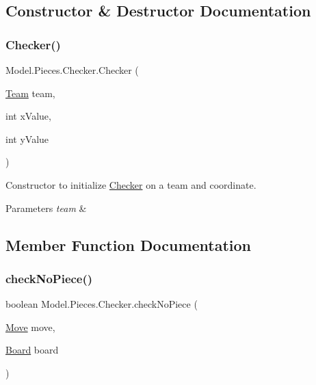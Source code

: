 \subsection{Constructor \& Destructor Documentation}
\hypertarget{class_model_1_1_pieces_1_1_checker_af2b456d3e6c3ceff5a641fac1928fd5a}{}\label{class_model_1_1_pieces_1_1_checker_af2b456d3e6c3ceff5a641fac1928fd5a} 
\subsubsection{\texorpdfstring{Checker()}{Checker()}}
{\footnotesize\ttfamily Model.\+Pieces.\+Checker.\+Checker (\begin{DoxyParamCaption}\item[{\hyperlink{class_model_1_1_team}{Team}}]{team,  }\item[{int}]{x\+Value,  }\item[{int}]{y\+Value }\end{DoxyParamCaption})}

Constructor to initialize \hyperlink{class_model_1_1_pieces_1_1_checker}{Checker} on a team and coordinate. 
\begin{DoxyParams}{Parameters}
{\em team} & \\
\hline
\end{DoxyParams}


\subsection{Member Function Documentation}
\hypertarget{class_model_1_1_pieces_1_1_checker_a39660db049663a3ee26f041642c31705}{}\label{class_model_1_1_pieces_1_1_checker_a39660db049663a3ee26f041642c31705} 
\subsubsection{\texorpdfstring{check\+No\+Piece()}{checkNoPiece()}}
{\footnotesize\ttfamily boolean Model.\+Pieces.\+Checker.\+check\+No\+Piece (\begin{DoxyParamCaption}\item[{\hyperlink{class_model_1_1_move}{Move}}]{move,  }\item[{\hyperlink{class_model_1_1_board}{Board}}]{board }\end{DoxyParamCaption})}

